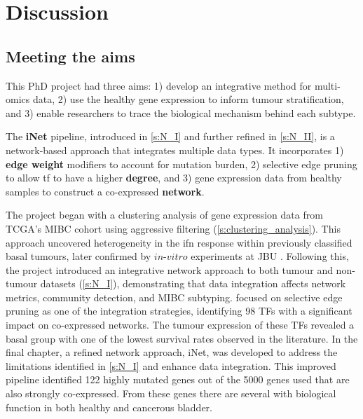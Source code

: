 \chapter{Discussion} \label{s:discussion}

\vspace{3mm}
\vspace{3mm}


\section{Meeting the aims}

This PhD project had three aims: 1) develop an integrative method for multi-omics data, 2) use the healthy gene expression to inform tumour stratification, and 3) enable researchers to trace the biological mechanism behind each subtype.

The \textbf{iNet} pipeline, introduced in \cref{s:N_I} and further refined in \cref{s:N_II}, is a network-based approach that integrates multiple data types. It incorporates 1) \textbf{edge weight} modifiers to account for mutation burden, 2) selective edge pruning to allow \acrlong{tf} to have a higher \textbf{degree}, and 3) gene expression data from healthy samples to construct a co-expressed \textbf{network}.


The project began with a clustering analysis of gene expression data from TCGA's MIBC cohort using aggressive filtering (\cref{s:clustering_analysis}). This approach uncovered heterogeneity in the \acrlong{ifn} response within previously classified basal tumours, later confirmed by $in$-$vitro$ experiments at JBU \citep{Baker2022-bj}. Following this, the project introduced an integrative network approach to both tumour and non-tumour datasets (\cref{s:N_I}), demonstrating that data integration affects network metrics, community detection, and MIBC subtyping.  focused on selective edge pruning as one of the integration strategies, identifying 98 TFs with a significant impact on co-expressed networks. The tumour expression of these TFs revealed a basal group with one of the lowest survival rates observed in the literature. In the final chapter, a refined network approach, iNet, was developed to address the limitations identified in \cref{s:N_I} and enhance data integration. This improved pipeline identified 122 highly mutated genes out of the 5000 genes used that are also strongly co-expressed. From these genes there are several with biological function in both healthy  and cancerous bladder.

